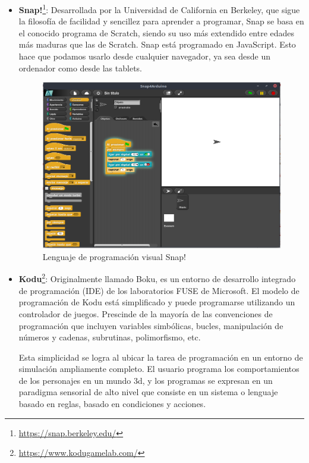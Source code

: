 \begin{itemize}
\item \textbf{Snap!}\footnote{\url{https://snap.berkeley.edu/}}: Desarrollada por la Universidad de California en Berkeley, que sigue la filosofía de facilidad y sencillez para aprender a programar, Snap se basa en el conocido programa de Scratch, siendo su uso más extendido entre edades más maduras que las de Scratch.
Snap está programado en JavaScript. Esto hace que podamos usarlo desde cualquier navegador, ya sea desde un ordenador como desde las tablets.

\begin{figure}[H]
\centering
\includegraphics[scale=0.40]{img/snap.png}
\caption{Lenguaje de programación visual Snap!}
\label{fig:snap}
\end{figure}

\item \textbf{Kodu}\footnote{\url{https://www.kodugamelab.com/}}: Originalmente llamado Boku, es un entorno de desarrollo integrado de programación (IDE) de los laboratorios FUSE de Microsoft. El modelo de programación de Kodu está simplificado y puede programarse utilizando un controlador de juegos. Prescinde de la mayoría de las convenciones de programación que incluyen variables simbólicas, bucles, manipulación de números y cadenas, subrutinas, polimorfismo, etc.

Esta simplicidad se logra al ubicar la tarea de programación en un entorno de simulación ampliamente completo. El usuario programa los comportamientos de los personajes en un mundo 3d, y los programas se expresan en un paradigma sensorial de alto nivel que consiste en un sistema o lenguaje basado en reglas, basado en condiciones y acciones.


\end{itemize}

